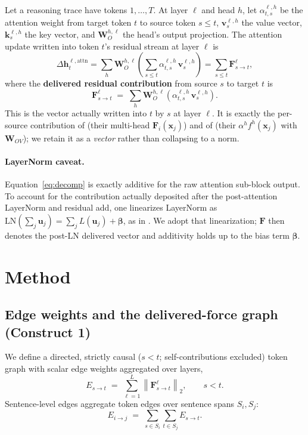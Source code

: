 \documentclass[11pt]{article}
\newcommand{\F}{\mathbf{F}}
\newcommand{\WO}{\mathbf{W}_O}
\newcommand{\vv}{\mathbf{v}}
\newcommand{\kk}{\mathbf{k}}
\newcommand{\hh}{\mathbf{h}}
\newcommand{\norm}[1]{\left\lVert #1 \right\rVert}
\begin{document}
Let a reasoning trace have tokens $1,\dots,T$. At layer $\ell$ and head $h$, let
$\alpha^{\ell,h}_{t,s}$ be the attention weight from target token $t$ to source token $s\le t$,
$\vv^{\ell,h}_s$ the value vector, $\kk^{\ell,h}_s$ the key vector, and $\WO^{h,\ell}$ the
head's output projection. The attention update written into token $t$'s residual stream at
layer $\ell$ is
\begin{equation}
\Delta\hh^{\ell,\mathrm{attn}}_t
= \sum_h \WO^{h,\ell}\!\left(\sum_{s\le t}\alpha^{\ell,h}_{t,s}\,\vv^{\ell,h}_s\right)
= \sum_{s\le t}\F^{\ell}_{s\to t},
\label{eq:decomp}
\end{equation}
where the \textbf{delivered residual contribution} from source $s$ to target $t$ is
\begin{equation}
\boxed{\;\F^{\ell}_{s\to t} \;=\; \sum_h \WO^{h,\ell}\!\left(\alpha^{\ell,h}_{t,s}\,\vv^{\ell,h}_s\right).\;}
\label{eq:F}
\end{equation}
This is the vector actually written into $t$ by $s$ at layer $\ell$. It is exactly the per-source
contribution of \cite{kobayashi2021incorporating} (their multi-head $\mathbf F_i(\mathbf x_j)$) and
of \cite{ferrando2024information} (their $\alpha^h f^h(\mathbf x_j)$ with $\mathbf W_{OV}$); we
retain it as a \emph{vector} rather than collapsing to a norm.

\paragraph{LayerNorm caveat.} Equation~\eqref{eq:decomp} is exactly additive for the raw
attention sub-block output. To account for the contribution actually deposited after the
post-attention LayerNorm and residual add, one linearizes LayerNorm as
$\mathrm{LN}(\sum_j \mathbf u_j)=\sum_j L(\mathbf u_j)+\bm\beta$, as in
\cite{kobayashi2021incorporating,ferrando2022measuring}. We adopt that linearization; $\F$ then
denotes the post-LN delivered vector and additivity holds up to the bias term $\bm\beta$.

\section{Method}

\subsection{Edge weights and the delivered-force graph (Construct 1)}

We define a directed, strictly causal ($s<t$; self-contributions excluded) token graph with
scalar edge weights aggregated over layers,
\begin{equation}
E_{s\to t} \;=\; \sum_{\ell=1}^{L}\norm{\F^{\ell}_{s\to t}}_2 ,\qquad s<t .
\label{eq:edge}
\end{equation}
Sentence-level edges aggregate token edges over sentence spans $S_i,S_j$:
\begin{equation}
E_{i\to j} \;=\; \sum_{s\in S_i}\sum_{t\in S_j} E_{s\to t}.
\label{eq:sentedge}
\end{equation}
\end{document}
